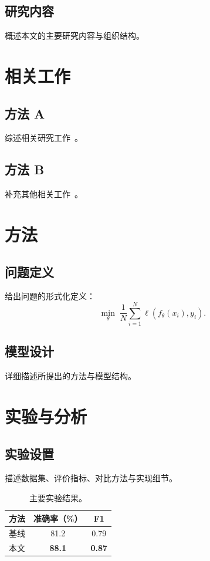 \documentclass[zihao=-4, a4paper, oneside]{ctexbook}
\begin{document}
\section{研究内容}
概述本文的主要研究内容与组织结构。

\chapter{相关工作}
\section{方法 A}
综述相关研究工作~\cite{ref1}。
\section{方法 B}
补充其他相关工作~\cite{ref2}。

\chapter{方法}
\section{问题定义}
给出问题的形式化定义：
\begin{equation}
  \min_{\theta} \; \frac{1}{N} \sum_{i=1}^{N} \ell\!\left(f_\theta(x_i), y_i\right).
\end{equation}

\section{模型设计}
详细描述所提出的方法与模型结构。

\chapter{实验与分析}
\section{实验设置}
描述数据集、评价指标、对比方法与实现细节。

\begin{table}[htbp]
  \centering
  \caption{主要实验结果。}
  \begin{tabular}{lcc}
    \toprule
    方法 & 准确率（\%） & F1 \\
    \midrule
    基线 & 81.2 & 0.79 \\
    本文 & \textbf{88.1} & \textbf{0.87} \\
    \bottomrule
  \end{tabular}
\end{table}
\end{document}
